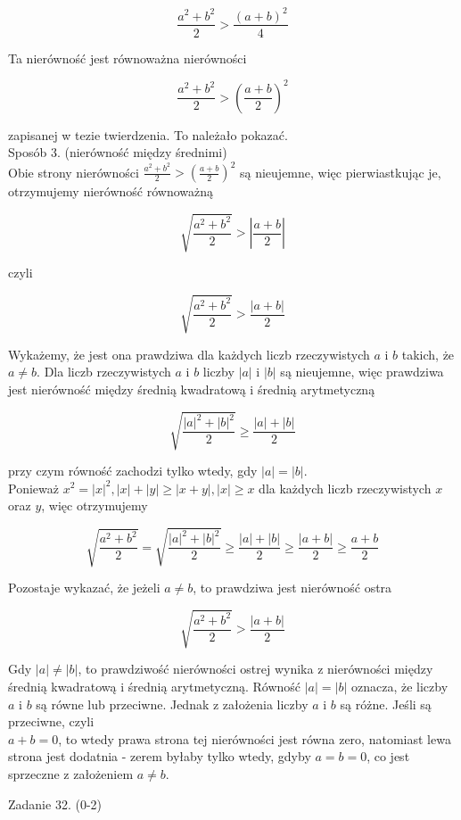 \documentclass[10pt]{article}
\begin{document}
$$
\frac{a^{2}+b^{2}}{2}>\frac{(a+b)^{2}}{4}
$$

Ta nierówność jest równoważna nierówności

$$
\frac{a^{2}+b^{2}}{2}>\left(\frac{a+b}{2}\right)^{2}
$$

zapisanej w tezie twierdzenia. To należało pokazać.\\
Sposób 3. (nierówność między średnimi)\\
Obie strony nierówności $\frac{a^{2}+b^{2}}{2}>\left(\frac{a+b}{2}\right)^{2}$ są nieujemne, więc pierwiastkując je, otrzymujemy nierówność równoważną

$$
\sqrt{\frac{a^{2}+b^{2}}{2}}>\left|\frac{a+b}{2}\right|
$$

czyli

$$
\sqrt{\frac{a^{2}+b^{2}}{2}}>\frac{|a+b|}{2}
$$

Wykażemy, że jest ona prawdziwa dla każdych liczb rzeczywistych $a$ i $b$ takich, że $a \neq b$. Dla liczb rzeczywistych $a$ i $b$ liczby $|a|$ i $|b|$ są nieujemne, więc prawdziwa jest nierówność między średnią kwadratową i średnią arytmetyczną

$$
\sqrt{\frac{|a|^{2}+|b|^{2}}{2}} \geq \frac{|a|+|b|}{2}
$$

przy czym równość zachodzi tylko wtedy, gdy $|a|=|b|$.\\
Ponieważ $x^{2}=|x|^{2},|x|+|y| \geq|x+y|,|x| \geq x$ dla każdych liczb rzeczywistych $x$ oraz $y$, więc otrzymujemy

$$
\sqrt{\frac{a^{2}+b^{2}}{2}}=\sqrt{\frac{|a|^{2}+|b|^{2}}{2}} \geq \frac{|a|+|b|}{2} \geq \frac{|a+b|}{2} \geq \frac{a+b}{2}
$$

Pozostaje wykazać, że jeżeli $a \neq b$, to prawdziwa jest nierówność ostra

$$
\sqrt{\frac{a^{2}+b^{2}}{2}}>\frac{|a+b|}{2}
$$

Gdy $|a| \neq|b|$, to prawdziwość nierówności ostrej wynika z nierówności między średnią kwadratową i średnią arytmetyczną. Równość $|a|=|b|$ oznacza, że liczby $a$ i $b$ są równe lub przeciwne. Jednak z założenia liczby $a$ i $b$ są różne. Jeśli są przeciwne, czyli\\
$a+b=0$, to wtedy prawa strona tej nierówności jest równa zero, natomiast lewa strona jest dodatnia - zerem byłaby tylko wtedy, gdyby $a=b=0$, co jest sprzeczne z założeniem $a \neq b$.

Zadanie 32. (0-2)
\end{document}

